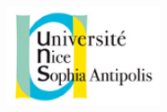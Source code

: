 \newcommand{\reporttitle}{Immersive Virtual Reality System}     %
\newcommand{\reportsubtitle}{SIGVerse interaction trough Robot Operating System}     %
\newcommand{\reportauthor}{Geneviève \textsc{Cirera} (SI5 - Web)} %
\newcommand{\reportsubject}{Final report} %
\newcommand{\HRule}{\rule{\linewidth}{0.5mm}}
\setlength{\parskip}{1ex} %

\begin{titlepage}

\begin{center}

\begin{minipage}[t]{0.49\textwidth}
\vspace*{-2cm}
  \begin{flushleft}
    \includegraphics [width=45mm]{images/uns.png} \\%
    

\end{flushleft}
\end{minipage}
\end{center}
\end{titlepage}
